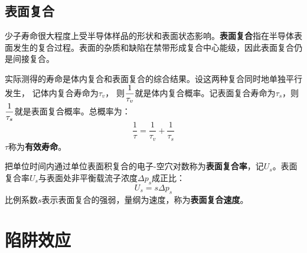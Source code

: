 \subsection{表面复合}

少子寿命很大程度上受半导体样品的形状和表面状态影响。\textbf{表面复合}指在半导体表面发生的复合过程。表面的杂质和缺陷在禁带形成复合中心能级，因此表面复合仍是间接复合。

实际测得的寿命是体内复合和表面复合的综合结果。设这两种复合同时地单独平行发生，\vspace{1ex}
记体内复合寿命为$\tau_v$，
\vspace{1ex}则$\displaystyle \frac{1}{\tau_v}$就是体内复合概率。记表面复合寿命为$\tau_s$，则$\displaystyle \frac{1}{\tau_s}$就是表面复合概率。总概率为：
\begin{equation}
    \frac{1}{\tau}=\frac{1}{\tau_v}+\frac{1}{\tau_s}
\end{equation}
$\tau$称为\textbf{有效寿命}。

把单位时间内通过单位表面积复合的电子-空穴对数称为\textbf{表面复合率}，记$U_s$。表面复合率$U_s$与表面处非平衡载流子浓度$\Delta p_s$成正比：
\begin{equation}
    U_s=s\Delta p_s
\end{equation}
比例系数$s$表示表面复合的强弱，量纲为速度，称为\textbf{表面复合速度}。

\section{陷阱效应}









